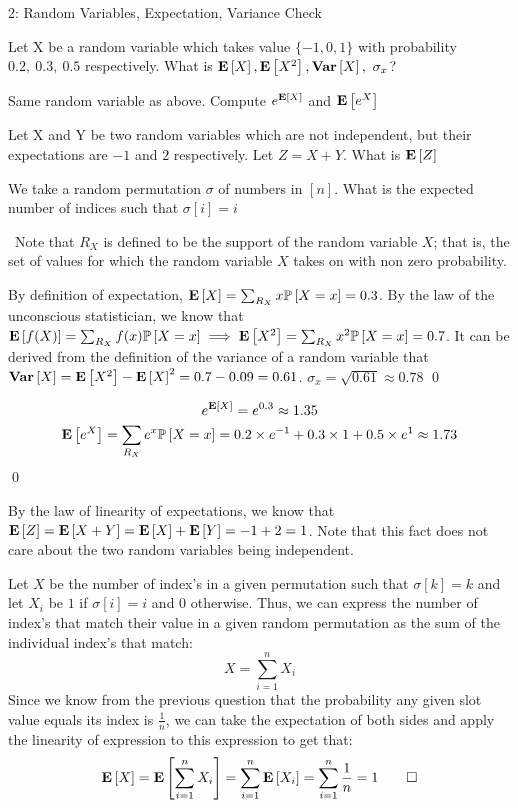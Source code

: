\documentclass[12pt]{article}
\begin{document}
\clearpage
\begin{problem}{2: Random Variables, Expectation, Variance Check}\
\begin{subprob}
    \item Let X be a random variable which takes value $\{-1,0,1\}$ with probability $0.2,~0.3,~0.5$ respectively. What is $\mathbf{E}\left[X\right],\mathbf{E}\left[X^2\right], \mathbf{Var}\left[X\right],~\sigma_x$?
    \item Same random variable as above. Compute $e^{\mathbf{E}\left[X\right]}$ and $\mathbf{E}\left[e^{X}\right]$
    \item Let X and Y be two random variables which are not independent, but their expectations are $-1$ and $2$ respectively. Let $Z = X + Y$. What is $\mathbf{E}\left[Z\right]$
    \item We take a random permutation $\sigma$ of numbers in $[n]$. What is the expected number of indices such that $\sigma[i] = i$
\end{subprob}
\end{problem}

\begin{solution} \
Note that $R_X$ is defined to be the support of the random variable $X$; that is, the set of values for which the random variable $X$ takes on with non zero probability.
\begin{subprob}
    \item By definition of expectation, $\mathbf{E}\left[X\right] = \sum_{R_X}{x\mathbb{P}\left[X=x\right]} = 0.3$. By the law of the unconscious statistician, we know that $\mathbf{E}\left[f(X)\right] = \sum_{{R_X}}{f(x)\mathbb{P}\left[X=x\right]} \implies \mathbf{E}\left[X^2\right]= \sum_{R_X}{x^2\mathbb{P}\left[X=x\right]} = 0.7$. It can be derived from the definition of the variance of a random variable that $\mathbf{Var}\left[X\right] = \mathbf{E}\left[X^2\right] - \mathbf{E}\left[X\right]^2 = 0.7 - 0.09 = 0.61$. $\sigma_x = \sqrt{0.61} \approx 0.78$ \qed
    \item 
    \[
    e^{\mathbf{E}\left[X\right]} = e^{0.3} \approx 1.35
    \]
    \[
    \mathbf{E}\left[e^{X}\right] = \sum_{R_X}{e^x\mathbb{P}\left[X=x\right]} = 0.2 \times e^{-1} + 0.3 \times 1 + 0.5 \times e^{1} \approx 1.73
    \] \qed
    \item By the law of linearity of expectations, we know that $\mathbf{E}\left[Z\right] = \mathbf{E}\left[X + Y\right] = \mathbf{E}\left[X\right] + \mathbf{E}\left[Y\right] = -1 + 2 = 1$. Note that this fact does not care about the two random variables being independent.
    \item Let $X$ be the number of index's in a given permutation such that $\sigma[k] = k$ and let $X_i$ be $1$ if $\sigma[i] = i$ and $0$ otherwise. Thus, we can express the number of index's that match their value in a given random permutation as the sum of the individual index's that match: \[
    X = \sum_{i=1}^{n}{X_i}
    \]Since we know from the previous question that the probability any given slot value equals its index is $\frac{1}{n}$, we can take the expectation of both sides and apply the linearity of expression to this expression to get that:
    \[\mathbf{E}\left[X\right] = \mathbf{E}\left[\sum_{i=1}^{n}{X_i}\right] = \sum_{i=1}^n{\mathbf{E}\left[X_i\right]} =\sum_{i=1}^n{\frac{1}{n}} = 1 \qed\]
\end{subprob}
\end{solution}
\end{document}
